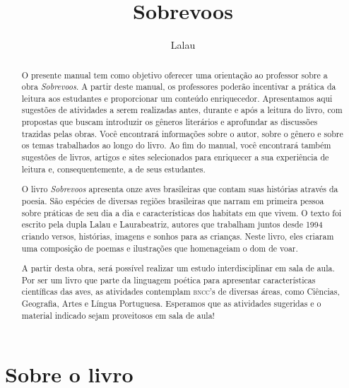 \documentclass[11pt]{extarticle}
\newcommand{\AutorLivro}{Lalau}
\newcommand{\TituloLivro}{Sobrevoos}
\newcommand{\colaborador}{Ana Lancman}
\begin{document}
\title{\TituloLivro}
\author{\AutorLivro}
\def\authornotes{\colaborador}

\date{}
\maketitle


\tableofcontents

\begin{abstract}

O presente manual tem como objetivo oferecer uma orientação ao professor sobre a obra \textit{Sobrevoos}. A partir deste manual, os professores poderão incentivar a prática da leitura aos estudantes e proporcionar um conteúdo enriquecedor. Apresentamos aqui sugestões de atividades a serem realizadas antes, durante e após a leitura do livro, com propostas que buscam introduzir os gêneros literários e aprofundar as discussões trazidas pelas obras. Você encontrará informações sobre o autor, sobre o gênero e sobre os temas trabalhados ao longo do livro. Ao fim do manual, você encontrará também sugestões de livros, artigos e sites selecionados para enriquecer a sua experiência de leitura e, consequentemente, a de seus estudantes.

O livro \textit{Sobrevoos} apresenta onze aves brasileiras que contam suas histórias através da poesia. São espécies de diversas regiões brasileiras que narram em primeira pessoa sobre práticas de seu dia a dia e características dos habitats em que vivem. O texto foi escrito pela dupla Lalau e Laurabeatriz, autores que trabalham juntos desde 1994 criando versos, histórias, imagens
e sonhos para as crianças. Neste livro, eles criaram uma composição de poemas e ilustrações que homenageiam o dom de voar. 

A partir desta obra, será possível realizar um estudo interdisciplinar em sala de aula. Por ser um livro que parte da linguagem poética para apresentar características científicas das aves, as atividades contemplam \textsc{bncc}'s de diversas áreas, como Ciências, Geografia, Artes e Língua Portuguesa. Esperamos que as atividades sugeridas e o material indicado sejam proveitosos em sala de aula! 

\end{abstract}

\section{Sobre o livro}
\end{document}
